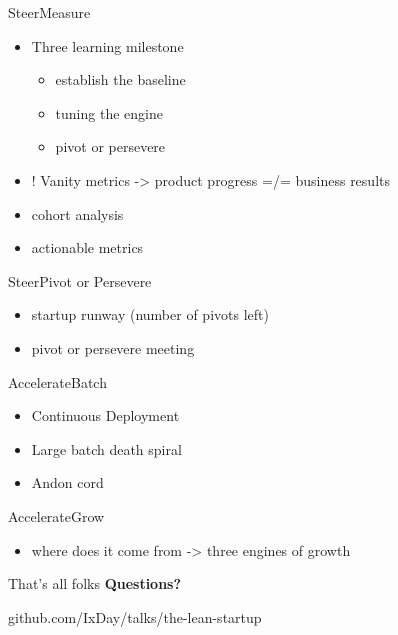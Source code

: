 \documentclass[aspectratio=169]{beamer}
\begin{document}
\begin{frame}{Steer}{Measure}
  \begin{itemize}
    \item Three learning milestone
      \begin{itemize}
        \item establish the baseline
        \item tuning the engine
        \item pivot or persevere
      \end{itemize}

    \item ! Vanity metrics -> product progress =/= business results
    \item cohort analysis
    \item actionable metrics
  \end{itemize}
\end{frame}

\begin{frame}{Steer}{Pivot or Persevere}
  \begin{itemize}
    \item startup runway (number of pivots left)
    \item pivot or persevere meeting
  \end{itemize}
\end{frame}

\begin{frame}{Accelerate}{Batch}
  \begin{itemize}
    \item Continuous Deployment
    \item Large batch death spiral
    \item Andon cord
  \end{itemize}
\end{frame}

\begin{frame}{Accelerate}{Grow}
  \begin{itemize}
    \item where does it come from -> three engines of growth
  \end{itemize}
\end{frame}

\begin{frame}{That's all folks}
  \LARGE \textbf{Questions?}

  \begin{flushright}
    \normalsize github.com/\color{Green}IxDay\color{Grey}/talks/the-lean-startup
   \end{flushright}
\end{frame}
\end{document}
